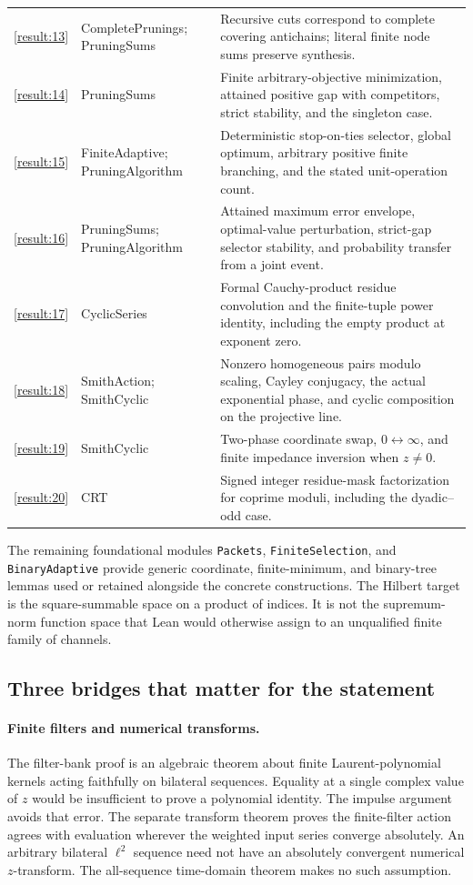 \documentclass[11pt,letterpaper]{article}
\theoremstyle{plain}
\theoremstyle{plain}
\theoremstyle{plain}
\theoremstyle{definition}
\theoremstyle{definition}
\theoremstyle{definition}
\theoremstyle{definition}
\theoremstyle{remark}
\theoremstyle{remark}
\theoremstyle{remark}
\theoremstyle{remark}
\begin{document}
\begin{longtable}{L{0.09\textwidth}L{0.28\textwidth}L{0.53\textwidth}}
\ref{result:13}&CompletePrunings; PruningSums&Recursive cuts correspond to complete covering antichains; literal finite node sums preserve synthesis.\\
\ref{result:14}&PruningSums&Finite arbitrary-objective minimization, attained positive gap with competitors, strict stability, and the singleton case.\\
\ref{result:15}&FiniteAdaptive; PruningAlgorithm&Deterministic stop-on-ties selector, global optimum, arbitrary positive finite branching, and the stated unit-operation count.\\
\ref{result:16}&PruningSums; PruningAlgorithm&Attained maximum error envelope, optimal-value perturbation, strict-gap selector stability, and probability transfer from a joint event.\\
\ref{result:17}&CyclicSeries&Formal Cauchy-product residue convolution and the finite-tuple power identity, including the empty product at exponent zero.\\
\ref{result:18}&SmithAction; SmithCyclic&Nonzero homogeneous pairs modulo scaling, Cayley conjugacy, the actual exponential phase, and cyclic composition on the projective line.\\
\ref{result:19}&SmithCyclic&Two-phase coordinate swap, $0\leftrightarrow\infty$, and finite impedance inversion when $z\ne0$.\\
\ref{result:20}&CRT&Signed integer residue-mask factorization for coprime moduli, including the dyadic--odd case.\\
\bottomrule
\end{longtable}
\endgroup

The remaining foundational modules \texttt{Packets}, \texttt{FiniteSelection}, and \texttt{BinaryAdaptive} provide generic coordinate, finite-minimum, and binary-tree lemmas used or retained alongside the concrete constructions. The Hilbert target is the square-summable space on a product of indices. It is not the supremum-norm function space that Lean would otherwise assign to an unqualified finite family of channels.

\subsection{Three bridges that matter for the statement}

\paragraph{Finite filters and numerical transforms.}
The filter-bank proof is an algebraic theorem about finite Laurent-polynomial kernels acting faithfully on bilateral sequences. Equality at a single complex value of $z$ would be insufficient to prove a polynomial identity. The impulse argument avoids that error. The separate transform theorem proves the finite-filter action agrees with evaluation wherever the weighted input series converge absolutely. An arbitrary bilateral $\ell^2$ sequence need not have an absolutely convergent numerical $z$-transform. The all-sequence time-domain theorem makes no such assumption.
\end{document}

